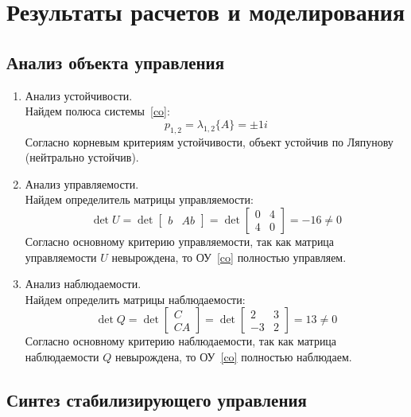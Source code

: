 \section{Результаты расчетов и моделирования}
\subsection{Анализ объекта управления}

\begin{enumerate}[1.]
	\item Анализ устойчивости.\\	
	Найдем полюса системы~\eqref{co}:
	\begin{equation}
		p_{1,2} = \lambda_{1,2}\{A\} = \pm 1i
	\end{equation}
	Согласно корневым критериям устойчивости, объект устойчив по Ляпунову (нейтрально устойчив).
	
	\item Анализ управляемости.\\
	Найдем определитель матрицы управляемости:
	\begin{equation}
		\det{U} = 
		\det{\begin{bmatrix}b & A b\end{bmatrix}} =
		\det{\begin{bmatrix}0 & 4\\ 4 & 0\end{bmatrix}} = -16 \neq 0
	\end{equation}
	Согласно основному критерию управляемости, так как матрица управляемости $U$ невырождена, то ОУ~\eqref{co} полностью управляем.
	
	\item Анализ наблюдаемости.\\
	Найдем определить матрицы наблюдаемости:
	\begin{equation}
	\det{Q} = 
	\det{\begin{bmatrix}C \\ C A\end{bmatrix}} =
	\det{\begin{bmatrix}2 & 3\\ -3 & 2\end{bmatrix}} = 13 \neq 0
	\end{equation}
	Согласно основному критерию наблюдаемости, так как матрица наблюдаемости $Q$ невырождена, то ОУ~\eqref{co} полностью наблюдаем.
\end{enumerate}

\subsection{Синтез стабилизирующего управления}

